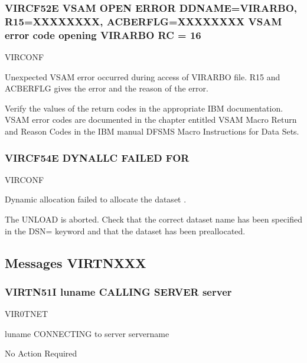 \documentclass[letterpaper,10pt,english]{sphinxmanual}
\begin{document}
\subsubsection{VIRCF52E VSAM OPEN ERROR DDNAME=VIRARBO, R15=XXXXXXXX, ACBERFLG=XXXXXXXX VSAM error code opening VIRARBO \sphinxhyphen{} RC = 16}
\label{\detokenize{messages:vircf52e-vsam-open-error-ddname-virarbo-r15-xxxxxxxx-acberflg-xxxxxxxx-vsam-error-code-opening-virarbo-rc-16}}\begin{description}
\sphinxAtStartPar
VIRCONF

\sphinxAtStartPar
Unexpected VSAM error occurred during access of VIRARBO file. R15 and ACBERFLG gives the error and the reason of the error.

\sphinxAtStartPar
Verify the values of the return codes in the appropriate IBM documentation. VSAM error codes are documented in the chapter entitled VSAM Macro Return and Reason Codes in the IBM manual DFSMS Macro Instructions for Data Sets.

\end{description}


\subsubsection{VIRCF54E DYNALLC FAILED FOR }
\label{\detokenize{messages:vircf54e-dynallc-failed-for-dsname}}\begin{description}
\sphinxAtStartPar
VIRCONF

\sphinxAtStartPar
Dynamic allocation failed to allocate the dataset .

\sphinxAtStartPar
The UNLOAD is aborted. Check that the correct dataset name has been specified in the DSN= keyword and that the dataset has been preallocated.

\end{description}


\subsection{Messages VIRTNXXX}
\label{\detokenize{messages:messages-virtnxxx}}

\subsubsection{VIRTN51I  luname CALLING SERVER server}
\label{\detokenize{messages:virtn51i-luname-calling-server-server}}\begin{description}
\sphinxAtStartPar
VIR0TNET

\sphinxAtStartPar
luname CONNECTING to server servername

\sphinxAtStartPar
No Action Required

\end{description}
\end{document}
